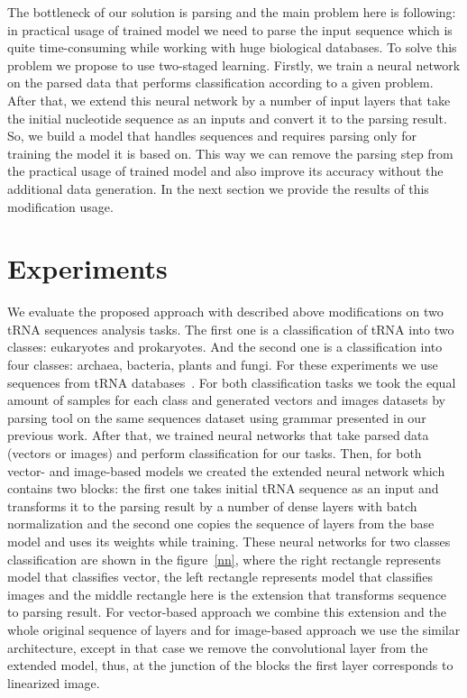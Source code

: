 \documentclass[12pt,a4paper]{cibb}
\begin{document}
The bottleneck of our solution is parsing and the main problem here is following: in practical usage of trained model we need to parse the input sequence which is quite time-consuming while working with huge biological databases.
To solve this problem we propose to use two-staged learning.
Firstly, we train a neural network on the parsed data that performs classification according to a given problem.
After that, we extend this neural network by a number of input layers that take the initial nucleotide sequence as an inputs and convert it to the parsing result.
So, we build a model that handles sequences and requires parsing only for training the model it is based on.
This way we can remove the parsing step from the practical usage of trained model and also improve its accuracy without the additional data generation.
In the next section we provide the results of this modification usage.


\section{\bf Experiments}

We evaluate the proposed approach with described above modifications on two tRNA sequences analysis tasks. 
The first one is a classification of tRNA into two classes: eukaryotes and prokaryotes.
And the second one is a classification into four classes: archaea, bacteria, plants and fungi.
For these experiments we use sequences from tRNA databases~\cite{trnadb1,trnadb2}.
For both classification tasks we took the equal amount of samples for each class and generated vectors and images datasets by parsing tool on the same sequences dataset using grammar presented in our previous work.
After that, we trained neural networks that take parsed data (vectors or images) and perform classification for our tasks.
Then, for both vector- and image-based models we created the extended neural network which contains two blocks: the first one takes initial tRNA sequence as an input and transforms it to the parsing result by a number of dense layers with batch normalization and the second one copies the sequence of layers from the base model and uses its weights while training.
These neural networks for two classes classification are shown in the figure~\ref{nn}, where the right rectangle represents model that classifies vector, the left rectangle represents model that classifies images and the middle rectangle here is the extension that transforms sequence to parsing result. For vector-based approach we combine this extension and the whole original sequence of layers and for image-based approach we use the similar architecture, except in that case we remove the convolutional layer from the extended model, thus, at the junction of the blocks the first layer corresponds to linearized image. 
\end{document}
